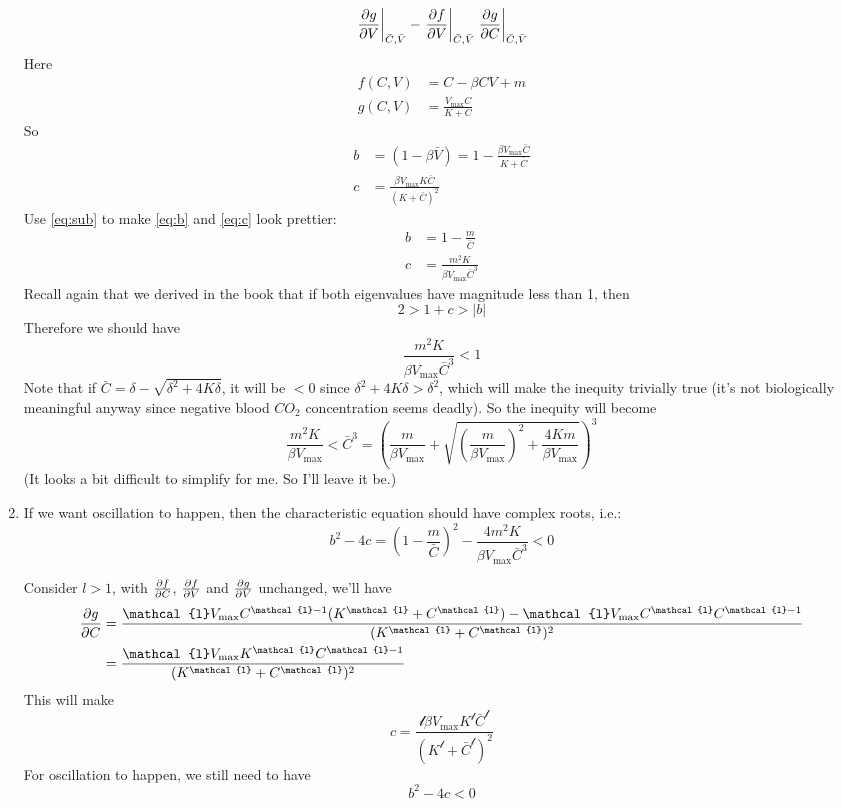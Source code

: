 \begin{homeworkProblem}
\begin{enumerate}
\[\begin{aligned}
        \left.\frac{\partial g}{\partial V}\right|_{\bar C, \bar V} -
        \left.\frac{\partial f}{\partial V}\right|_{\bar C, \bar V}
        \left.\frac{\partial g}{\partial C}\right|_{\bar C, \bar V}
    \end{aligned}
\]
Here \[
    \begin{aligned}
        f(C, V) &= C - \beta CV + m\\
        g(C, V) &= \frac{V_{\max}C}{K+C}
    \end{aligned}
\]
So
\begin{align}
    b &= (1- \beta \bar V) = 1- \frac{\beta V_{\max}\bar C}{K+\bar C}
    \label{eq:b}\\
    c &= \frac{\beta  V_{\max} K \bar C}{(K + \bar C)^2}\label{eq:c}
\end{align}
Use \eqref{eq:sub} to make \eqref{eq:b} and \eqref{eq:c} look prettier:
\[
    \begin{aligned}
        b &= 1 - \frac{m}{\bar C}\\
        c &= \frac{m^2K}{\beta V_{\max} \bar C^3}
    \end{aligned}
\]
Recall again that we derived in the book that if both eigenvalues have magnitude
less than 1, then \[
    2 > 1 + c > |b|
\]
Therefore we should have \[
    \frac{m^2K}{\beta V_{\max} \bar C^3} < 1
\]
Note that if $\bar C = \delta - \sqrt{\delta^2 + 4K\delta}$, it will be $< 0$
since $\delta^2 + 4K\delta > \delta^2$, which will make the inequity trivially 
true (it's not biologically meaningful anyway since negative blood $CO_2$ 
concentration seems deadly). So the inequity will become \[
    \frac{m^2K}{\beta V_{\max}} < \bar C^3 = 
    \left( \frac{m}{\beta V_{\max}} + 
    \sqrt{\left(\frac{m}{\beta V_{\max}}\right)^2 + 
    \frac{4Km}{\beta V_{\max}}}\right)^3
\]
(It looks a bit difficult to simplify for me. So I'll leave it be.)

\item If we want oscillation to happen, then the characteristic equation should 
have complex roots, i.e.: \[
    b^2 - 4c = \left(1 - \frac{m}{\bar C}\right)^2 - 
    \frac{4m^2K}{\beta V_{\max}\bar C^3} < 0
\]

Consider $l > 1$, with $\frac{\partial f}{\partial C}$, $\frac{\partial f}{\partial V}$ and $\frac{\partial g}{\partial V}$ 
unchanged, we'll have \[
    \begin{aligned}
    \pderiv{g}{C} &= 
    \frac{
        \mathcal{l} V_{\max} C^{\mathcal{l} - 1}(K^\mathcal{l} + C^\mathcal{l})
        - \mathcal{l}V_{\max} C^{\mathcal{l}} C^{\mathcal{l} - 1}}{
            (K^{\mathcal{l}} + C^{\mathcal{l}})^2
        }\\
    &= \frac{\mathcal{l} V_{\max} K^{\mathcal{l}}C^{\mathcal{l}-1}}{
        (K^{\mathcal{l}} + C^{\mathcal{l}})^2
    }
    \end{aligned}
\]
This will make \[
    c = \frac{\mathcal{l} \beta V_{\max} K^{\mathcal{l}}\bar C^{\mathcal{l}}}{
        (K^{\mathcal{l}} + \bar C^{\mathcal{l}})^2
    }
\]
For oscillation to happen, we still need to have \[
    b^2 - 4c < 0
\]
\end{enumerate}

\end{homeworkProblem}